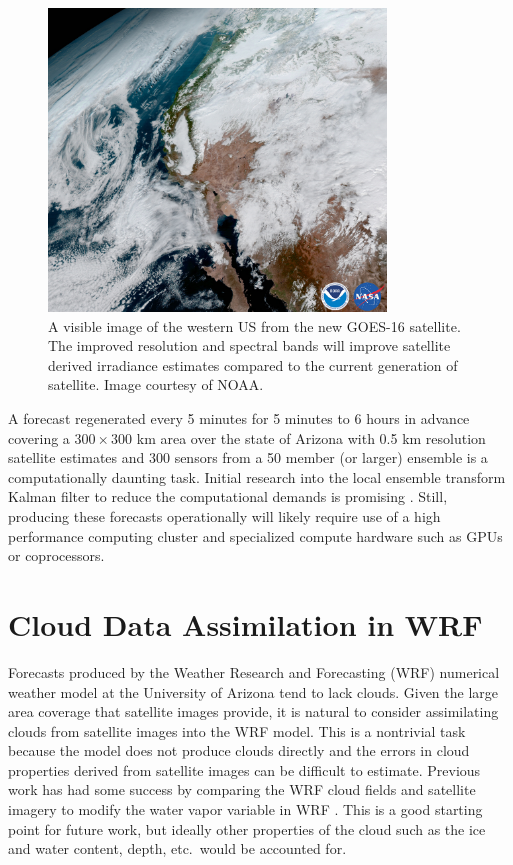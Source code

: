 \begin{figure}[h]
\centering
\includegraphics[width=0.8\textwidth]{figs/goes_cal.jpg}
\caption[An visible image of the western US from GOES-16]{A visible
image of the western US from the new GOES-16 satellite. The improved
resolution and spectral bands will improve satellite derived
irradiance estimates compared to the current generation of
satellite. Image courtesy of NOAA.}
\label{fig:goes_cal}
\end{figure}

A forecast regenerated every 5 minutes for 5 minutes to 6 hours in
advance covering a $300 \times 300$ km area over the state of Arizona
with 0.5 km resolution satellite estimates and 300 sensors from a 50
member (or larger) ensemble is a computationally daunting task.
Initial research into the local ensemble transform Kalman filter to
reduce the computational demands is promising \citep{Hunt2007}.
Still, producing these forecasts operationally will likely require use
of a high performance computing cluster and specialized compute
hardware such as GPUs or coprocessors.

\section{Cloud Data Assimilation in WRF}

Forecasts produced by the Weather Research and Forecasting (WRF)
numerical weather model at the University of Arizona tend to lack
clouds.
Given the large area coverage that satellite images provide, it is
natural to consider assimilating clouds from satellite images into the
WRF model.
This is a nontrivial task because the model does not produce clouds
directly and the errors in cloud properties derived from satellite
images can be difficult to estimate.
Previous work has had some success by comparing the WRF cloud fields
and satellite imagery to modify the water vapor variable in WRF
\citep{Mathiesen2013}.
This is a good starting point for future work, but ideally other
properties of the cloud such as the ice and water content, depth,
etc.\ would be accounted for.


